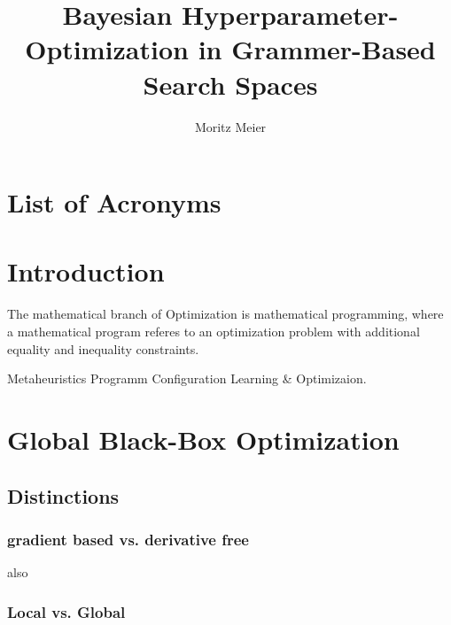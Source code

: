 \documentclass[english]{article}
\begin{document}
\title{Bayesian Hyperparameter-Optimization in Grammer-Based Search Spaces}
\author{Moritz Meier}
\maketitle
\tableofcontents
\newpage

\section*{List of Acronyms}
  \begin{acronym}
\end{acronym}

\section{Introduction}

The mathematical branch of Optimization is mathematical programming, where a mathematical program referes to an optimization problem with additional equality and inequality constraints.

Metaheuristics
Programm Configuration
Learning \& Optimizaion.


\section{Global Black-Box Optimization}

\subsection{Distinctions}

\subsubsection*{gradient based vs. derivative free}
also

\subsubsection*{Local vs. Global}
\end{document}
